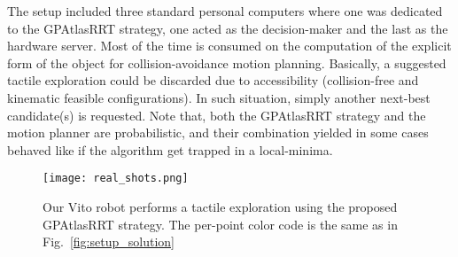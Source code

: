The setup included three standard personal computers where one was dedicated to the GPAtlasRRT strategy, one acted as the decision-maker and the last as the hardware server. Most of the time is consumed on the computation of the explicit form of the object for collision-avoidance motion planning. Basically, a suggested tactile exploration could be discarded due to accessibility (collision-free and kinematic feasible configurations). In such situation, simply another next-best candidate(s) is requested. Note that, both the GPAtlasRRT strategy and the motion planner are probabilistic, and their combination yielded in some cases behaved like if the algorithm get trapped in a local-minima.

\begin{figure}
\centering
  \texttt{[image: real\_shots.png]}
\caption{Our Vito robot performs a tactile exploration using the proposed GPAtlasRRT strategy. The per-point color code  is the same as in Fig.~\ref{fig:setup_solution}}
\label{fig:real}
\end{figure}